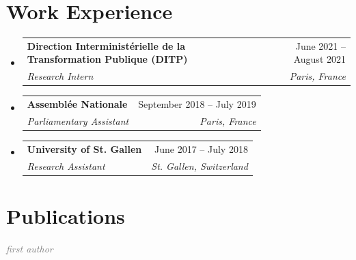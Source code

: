 \documentclass[letterpaper,11pt]{article}
\makeatletter
\newcommand{\resumeItem}[1]{
  \item\small{
    {#1 \vspace{-2pt}}
  }
}
\newcommand{\resumeSubheading}[4]{
  \vspace{1pt}\item
    \begin{tabular*}{0.97\textwidth}[t]{l@{\extracolsep{\fill}}r}
      \textbf{#1} & #2 \\
      \textit{\small#3} & \textit{\small #4} \\
    \end{tabular*}\vspace{-7pt}
}
\newcommand{\resumeSubSubheading}[2]{
    \item
    \begin{tabular*}{0.97\textwidth}{l@{\extracolsep{\fill}}r}
      \textit{\small#1} & \textit{\small #2} \\
    \end{tabular*}\vspace{-7pt}
}
\newcommand{\resumeSubHeadingListStart}{\begin{itemize}[leftmargin=0.15in, label={}]}
\newcommand{\resumeSubHeadingListEnd}{\end{itemize}}
\newcommand{\resumeItemListStart}{\begin{itemize}}
\newcommand{\resumeItemListEnd}{\end{itemize}\vspace{-5pt}}
\makeatother
\begin{document}
\section{Work Experience}
  \resumeSubHeadingListStart

    \resumeSubheading
      {Direction Interministérielle de la Transformation Publique (DITP)}{June 2021 -- August 2021}
      {Research Intern}{Paris, France}
      
    \resumeSubheading
      {Assemblée Nationale}{September 2018 -- July 2019}
      {Parliamentary Assistant}{Paris, France}

    \resumeSubheading
      {University of St. Gallen}{June 2017 -- July 2018}
      {Research Assistant}{St. Gallen, Switzerland}
      

  \resumeSubHeadingListEnd

\section{Publications}


\small

\noindent\textcolor{gray}{\textit{\footnotemark[1]first author}}
\vspace{5pt} %
\end{document}
